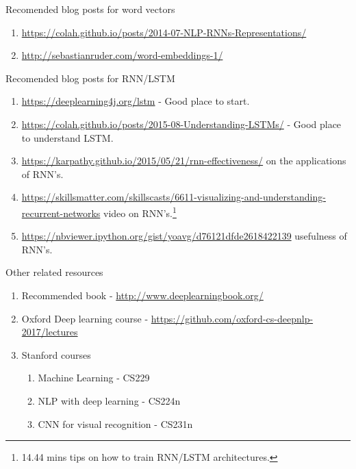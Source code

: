 \documentclass[10pt]{beamer}
\begin{document}
\begin{frame}[fragile]{Recomended blog posts for word vectors}
\begin{enumerate}
\item \url{https://colah.github.io/posts/2014-07-NLP-RNNs-Representations/}
\item \url{http://sebastianruder.com/word-embeddings-1/}
\end{enumerate}

\end{frame}

\begin{frame}[fragile]{Recomended blog posts for RNN/LSTM}
\begin{enumerate}
\item \url{https://deeplearning4j.org/lstm} - Good place to start.
\item \url{https://colah.github.io/posts/2015-08-Understanding-LSTMs/} - Good place to understand LSTM.
\item \url{https://karpathy.github.io/2015/05/21/rnn-effectiveness/} on the applications of RNN's.
\item \url{https://skillsmatter.com/skillscasts/6611-visualizing-and-understanding-recurrent-networks} video on RNN's.\footnote{14.44 mins tips on how to train RNN/LSTM architectures.}
\item \url{https://nbviewer.ipython.org/gist/yoavg/d76121dfde2618422139} usefulness of RNN's.
\end{enumerate}

\end{frame}

\begin{frame}[fragile]{Other related resources}
\begin{enumerate}
\item Recommended book - \url{http://www.deeplearningbook.org/}
\item Oxford Deep learning course - \url{https://github.com/oxford-cs-deepnlp-2017/lectures}
\item Stanford courses
\begin{enumerate}
\item Machine Learning - CS229
\item NLP with deep learning - CS224n 
\item CNN for visual recognition - CS231n
\end{enumerate}

\end{enumerate}

\end{frame}
\end{document}
